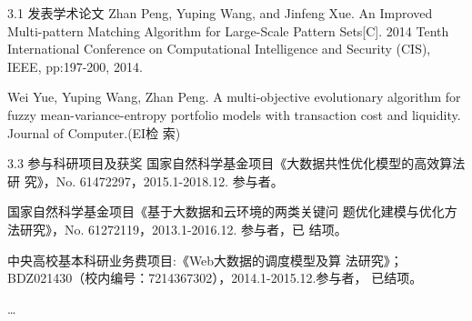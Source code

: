 \begin{resume}
\begin{resumelist}{\hspace{-0.25em}3.1\hspace{0.5em} 发表学术论文}
  \resumelistitem Zhan Peng, Yuping Wang, and Jinfeng Xue. An Improved
  Multi-pattern Matching Algorithm for Large-Scale Pattern
  Sets[C]. 2014 Tenth International Conference on Computational
  Intelligence and Security (CIS), IEEE, pp:197-200, 2014.

  \resumelistitem Wei Yue, Yuping Wang, Zhan Peng. A multi-objective
  evolutionary algorithm for fuzzy mean-variance-entropy portfolio
  models with transaction cost and liquidity. Journal of Computer.(EI检
  索)
\end{resumelist}

\begin{resumelist}{\hspace{-0.25em}3.3\hspace{0.5em} 参与科研项目及获奖}
  \resumelistitem 国家自然科学基金项目《大数据共性优化模型的高效算法研
  究》，No. 61472297，2015.1-2018.12. 参与者。


  \resumelistitem 国家自然科学基金项目《基于大数据和云环境的两类关键问
  题优化建模与优化方法研究》，No. 61272119，2013.1-2016.12. 参与者，已
  结项。

  \resumelistitem 中央高校基本科研业务费项目:《Web大数据的调度模型及算
  法研究》；BDZ021430（校内编号：7214367302），2014.1-2015.12.参与者，
  已结项。

\resumelistitem \ldots
\end{resumelist}
\end{resume}
